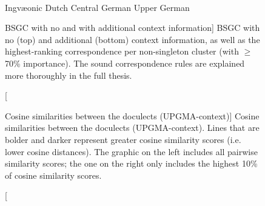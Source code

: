 \documentclass[a4paper, 11pt]{article}
\def\upper{\color{purple}\FilledBigTriangleUp}
\def\central{\color{midblue}\FilledBigSquare}
\def\dutch{\color{green}\FilledBigCircle}
\def\ingv{\color{green}\BigCircle}
\begin{document}
\begin{figure}[h]
\begin{adjustwidth}{-1.5cm}{-1cm}
\centering
\\
\vspace{1.5em}

\end{adjustwidth}

\vspace{0.5em}
\begin{center}
{\ingv} Ingv\ae{}onic \hspace{1em}
{\dutch} Dutch \hspace{1em}
{\central} Central German \hspace{1em}
{\upper} Upper German
\end{center}
\caption
[BSGC with no and with additional context information]
{BSGC with no (top) and additional (bottom) context information,
as well as the highest-ranking correspondence per non-singleton cluster
(with $\geq$70\% importance).
The sound correspondence rules are explained more thoroughly in the full thesis.
}
\label{fig:bsgc-trees}
\end{figure}

\begin{figure}[h]
\begin{adjustwidth}{-2cm}{-2cm}
\centering

\hspace{-7em}

\end{adjustwidth}
\caption
[Cosine similarities between the doculects (UPGMA-context)]
{
Cosine similarities between the doculects (UPGMA-context).
Lines that are bolder and darker represent greater cosine similarity scores
(i.e. lower cosine distances).
The graphic on the left includes all pairwise similarity scores;
the one on the right only includes the highest 10\% of cosine similarity scores.
}
\label{fig:cosine}
\end{figure}



\end{document}

